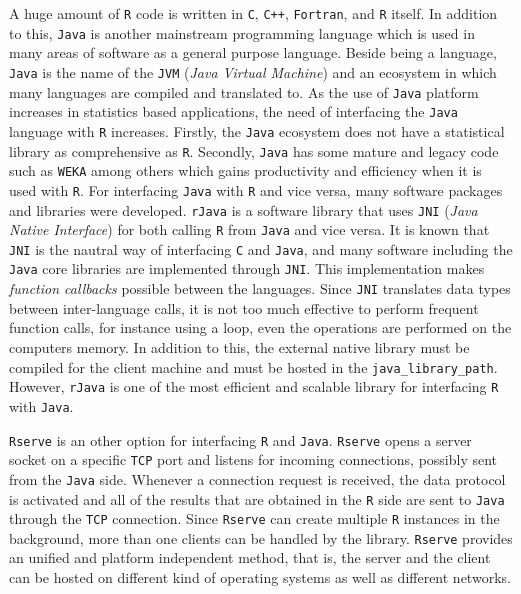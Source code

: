 \documentclass[10pt,a4paper, final, oneside]{article}
\begin{document}
A huge amount of \texttt{R} code is written in \texttt{C}, \texttt{C++}, \texttt{Fortran}, and \texttt{R} itself. In addition to this, \texttt{Java} is another mainstream programming language which is used in many areas of software as a general purpose language. Beside being a language, \texttt{Java} is the name of the \texttt{JVM} (\emph{Java Virtual Machine}) and an ecosystem in which many languages are compiled and translated to. As the use of \texttt{Java} platform increases in statistics based applications, the need of interfacing the \texttt{Java} language with \texttt{R} increases. Firstly, the \texttt{Java} ecosystem does not have a statistical library as comprehensive as \texttt{R}. Secondly, \texttt{Java} has some mature and legacy code such as \texttt{WEKA} \cite{hall2009weka,RWeka1,RWeka2} among others which gains productivity and efficiency when it is used with \texttt{R}. For interfacing \texttt{Java} with \texttt{R} and vice versa, many software packages and libraries were developed. \texttt{rJava} \cite{urbanek2009talk,rJava} is a software library that uses \texttt{JNI} \cite{gordon1998essential} (\emph{Java Native Interface}) for both calling \texttt{R} from \texttt{Java} and vice versa. It is known that \texttt{JNI} is the nautral way of interfacing \texttt{C} and \texttt{Java}, and many software including the \texttt{Java} core libraries are implemented through \texttt{JNI}. This implementation makes \emph{function callbacks} possible between the languages. Since \texttt{JNI} translates data types between inter-language calls, it is not too much effective to perform frequent function calls, for instance using a loop, even the operations are performed on the computers memory. In addition to this, the external native library must be compiled for the client machine and must be hosted in the \texttt{java\_library\_path}. However, \texttt{rJava} is one of the most efficient and scalable library for interfacing \texttt{R} with \texttt{Java}. 

\texttt{Rserve} \cite{urbanek2003fast} is an other option for interfacing \texttt{R} and \texttt{Java}. \texttt{Rserve} opens a server socket on a specific \texttt{TCP} port and listens for incoming connections, possibly sent from the \texttt{Java} side. Whenever a connection request is received, the data protocol is activated and all of the results that are obtained in the \texttt{R} side are sent to \texttt{Java} through the \texttt{TCP} connection. Since \texttt{Rserve} can create multiple \texttt{R} instances in the background, more than one clients can be handled by the library. \texttt{Rserve} provides an unified and platform independent method, that is, the server and the client can be hosted on different kind of operating systems as well as different networks. 
\end{document}
